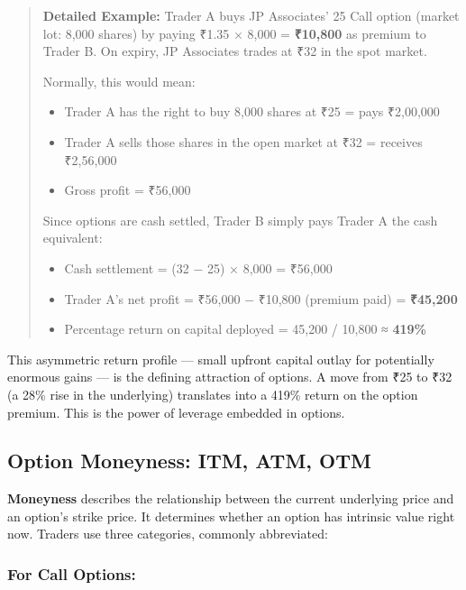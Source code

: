 \documentclass[12pt,openany]{book}
\begin{document}
\begin{quote}
\textbf{Detailed Example:} Trader A buys JP Associates' 25 Call option (market lot: 8,000 shares) by paying ₹1.35 × 8,000 = \textbf{₹10,800} as premium to Trader B. On expiry, JP Associates trades at ₹32 in the spot market.

Normally, this would mean:
\begin{itemize}[leftmargin=*]
    \item Trader A has the right to buy 8,000 shares at ₹25 = pays ₹2,00,000
    \item Trader A sells those shares in the open market at ₹32 = receives ₹2,56,000
    \item Gross profit = ₹56,000
\end{itemize}

Since options are cash settled, Trader B simply pays Trader A the cash equivalent:
\begin{itemize}[leftmargin=*]
    \item Cash settlement = (32 − 25) × 8,000 = ₹56,000
    \item Trader A's net profit = ₹56,000 − ₹10,800 (premium paid) = \textbf{₹45,200}
    \item Percentage return on capital deployed = 45,200 / 10,800 ≈ \textbf{419\%}
\end{itemize}
\end{quote}

This asymmetric return profile — small upfront capital outlay for potentially enormous gains — is the defining attraction of options. A move from ₹25 to ₹32 (a 28\% rise in the underlying) translates into a 419\% return on the option premium. This is the power of leverage embedded in options.


\subsection{Option Moneyness: ITM, ATM, OTM}

\textbf{Moneyness} describes the relationship between the current underlying price and an option's strike price. It determines whether an option has intrinsic value right now. Traders use three categories, commonly abbreviated:

\subsubsection{For Call Options:}
\end{document}
